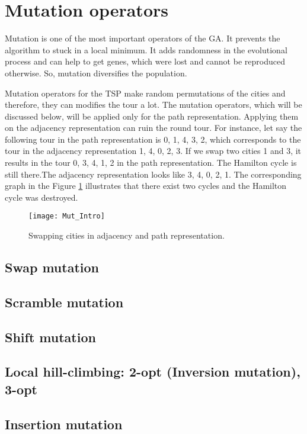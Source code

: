 \documentclass[a4paper, 12pt, headings=standardclasses]{scrartcl}
\begin{document}
\section{Mutation operators}
Mutation is one of the most important operators of the GA. It prevents the algorithm to stuck in a local minimum. It adds randomness in the evolutional process and can help to get genes, which were lost and cannot be reproduced otherwise. So, mutation diversifies the population.\par
Mutation operators for the TSP make random permutations of the cities and therefore, they can modifies the tour a lot. The mutation operators, which will be discussed below, will be applied only for the path representation. Applying them on the adjacency representation can ruin the round tour. For instance, let say the following tour in the path representation is 0, 1, 4, 3, 2, which corresponds to the tour in the adjacency representation 1, 4, 0, 2, 3. If we swap two cities 1 and 3, it results in the tour 0, 3, 4, 1, 2 in the path representation. The Hamilton cycle is still there.The adjacency representation looks like 3, 4, 0, 2, 1. The corresponding graph in the Figure \ref{mut_intro} illustrates that there exist two cycles and the Hamilton cycle was destroyed. \par

\begin{figure}[!ht]
	\centering
	\texttt{[image: Mut\_Intro]}
	\caption{Swapping cities in adjacency and path representation.}
	\label{mut_intro}
\end{figure}

\subsection{Swap mutation}
\subsection{Scramble mutation}
\subsection{Shift mutation}

\subsection{Local hill-climbing: 2-opt (Inversion mutation), 3-opt}
\subsection{Insertion mutation}
\end{document}
